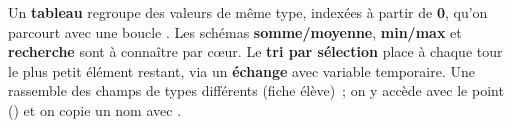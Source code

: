 \begin{aretenir}
Un \textbf{tableau} regroupe des valeurs de même type, indexées à partir de
\textbf{0}, qu'on parcourt avec une boucle . Les schémas
\textbf{somme/moyenne}, \textbf{min/max} et \textbf{recherche} sont à connaître par
cœur. Le \textbf{tri par sélection} place à chaque tour le plus petit élément
restant, via un \textbf{échange} avec variable temporaire. Une 
rassemble des champs de types différents (fiche élève)~; on y accède avec le point
() et on copie un nom avec .
\end{aretenir}
